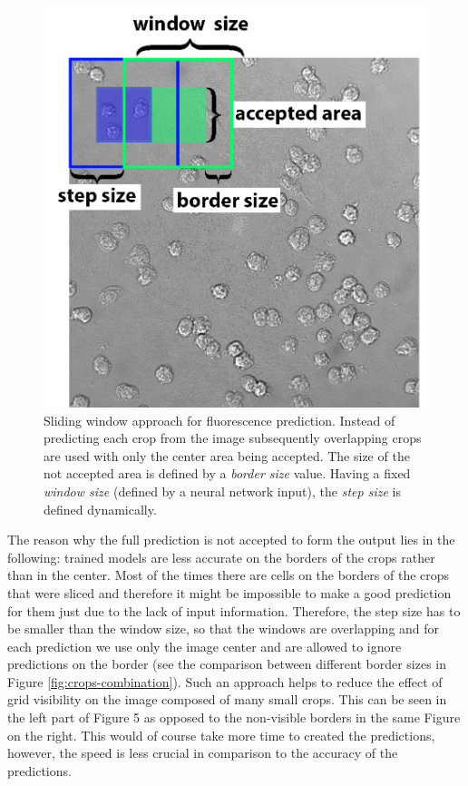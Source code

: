 \begin{figure}[htb]
	\begin{center}
		\includegraphics[width=0.5\linewidth]{bilder/sliding-window.png}
		\caption[Sliding window approach for fluorescence prediction]%
		{Sliding window approach for fluorescence prediction. Instead of predicting each crop from the image subsequently overlapping crops are used with only the center area being accepted. The size of the not accepted area is defined by a \textit{border size} value. Having a fixed \textit{window size} (defined by a neural network input), the \textit{step size} is defined dynamically.}\label{fig:sliding-window}
	\end{center}
\end{figure}
The reason why the full prediction is not accepted to form the output lies in the following: trained models are less accurate on the borders of the crops rather than in the center. Most of the times there are cells on the borders of the crops that were sliced and therefore it might be impossible to make a good prediction for them just due to the lack of input information. Therefore, the step size has to be smaller than the window size, so that the windows are overlapping and for each prediction we use only the image center and are allowed to ignore predictions on the border (see the comparison between different border sizes in Figure \ref{fig:crops-combination}). Such an approach helps to reduce the effect of grid visibility on the image composed of many small crops. This can be seen in the left part of Figure 5 as opposed to the non-visible borders in the same Figure on the right. This would of course take more time to created the predictions, however, the speed is less crucial in comparison to the accuracy of the predictions.

